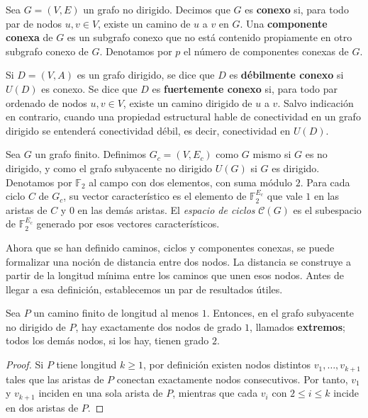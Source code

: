             \begin{definicion}
                Sea $G=(V,E)$ un grafo no dirigido. Decimos que $G$ es \textbf{conexo} si, para todo par de nodos $u,v\in V$, existe un camino de $u$ a $v$ en $G$. Una \textbf{componente conexa} de $G$ es un subgrafo conexo que no está contenido propiamente en otro subgrafo conexo de $G$. Denotamos por $p$ el número de componentes conexas de $G$.

                Si $D=(V,A)$ es un grafo dirigido, se dice que $D$ es \textbf{débilmente conexo} si $U(D)$ es conexo. Se dice que $D$ es \textbf{fuertemente conexo} si, para todo par ordenado de nodos $u,v\in V$, existe un camino dirigido de $u$ a $v$. Salvo indicación en contrario, cuando una propiedad estructural hable de conectividad en un grafo dirigido se entenderá conectividad débil, es decir, conectividad en $U(D)$.
            \end{definicion}

            \begin{definicion}
                Sea $G$ un grafo finito. Definimos $G_c=(V,E_c)$ como $G$ mismo si $G$ es no dirigido, y como el grafo subyacente no dirigido $U(G)$ si $G$ es dirigido. Denotamos por $\mathbb{F}_2$ al campo con dos elementos, con suma módulo $2$. Para cada ciclo $C$ de $G_c$, su vector característico es el elemento de $\mathbb{F}_2^{E_c}$ que vale $1$ en las aristas de $C$ y $0$ en las demás aristas. El \emph{espacio de ciclos} $\mathcal{C}(G)$ es el subespacio de $\mathbb{F}_2^{E_c}$ generado por esos vectores característicos.
            \end{definicion}

            Ahora que se han definido caminos, ciclos y componentes conexas, se puede formalizar una noción de distancia entre dos nodos. La distancia se construye a partir de la longitud mínima entre los caminos que unen esos nodos. Antes de llegar a esa definición, establecemos un par de resultados útiles.

            \begin{lema}
                Sea $P$ un camino finito de longitud al menos $1$.
                Entonces, en el grafo subyacente no dirigido de $P$, hay exactamente dos nodos de grado $1$, llamados \textbf{extremos}; todos los demás nodos, si los hay, tienen grado $2$.
            \end{lema}

            \begin{proof}
                Si $P$ tiene longitud $k\ge 1$, por definición existen nodos distintos $v_1,\dots,v_{k+1}$ tales que las aristas de $P$ conectan exactamente nodos consecutivos. Por tanto, $v_1$ y $v_{k+1}$ inciden en una sola arista de $P$, mientras que cada $v_i$ con $2\le i\le k$ incide en dos aristas de $P$.
            \end{proof}

